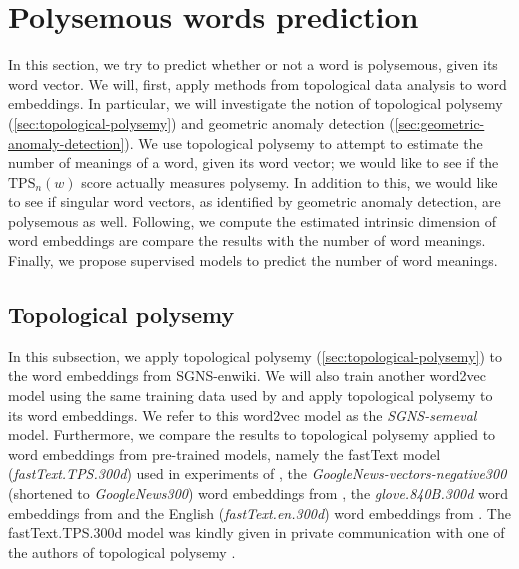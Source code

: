 \section{Polysemous words prediction}
\label{sec:analysis-of-embeddings-tda}
In this section, we try to predict whether or not a word is polysemous, given its word vector. We will, first, apply methods from topological data analysis to word embeddings. In particular, we will investigate the notion of topological polysemy (\cref{sec:topological-polysemy}) and geometric anomaly detection (\cref{sec:geometric-anomaly-detection}). We use topological polysemy to attempt to estimate the number of meanings of a word, given its word vector; we would like to see if the $\text{TPS}_n(w)$ score actually measures polysemy. In addition to this, we would like to see if singular word vectors, as identified by geometric anomaly detection, are polysemous as well. Following, we compute the estimated intrinsic dimension of word embeddings are compare the results with the number of word meanings. Finally, we propose supervised models to predict the number of word meanings.

\subsection{Topological polysemy}
\label{sec:analysis-of-embeddings-topological-polysemy}
In this subsection, we apply topological polysemy (\cref{sec:topological-polysemy}) to the word embeddings from SGNS-enwiki. We will also train another word2vec model using the same training data used by \cite{jakubowski2020topology} and apply topological polysemy to its word embeddings. We refer to this word2vec model as the \textit{SGNS-semeval} model. Furthermore, we compare the results to topological polysemy applied to word embeddings from pre-trained models, namely the fastText model (\textit{fastText.TPS.300d}) used in experiments of \cite{jakubowski2020topology}, the \textit{GoogleNews-vectors-negative300} (shortened to \textit{GoogleNews300}) word embeddings from \cite{GoogleCodeArchiveWord2vec}, the \textit{glove.840B.300d} word embeddings from \cite{GloVeProject2014} and the English (\textit{fastText.en.300d}) word embeddings from \cite{grave2018learning}. The fastText.TPS.300d model was kindly given in private communication with one of the authors of topological polysemy \cite{ZibrowiusPrivComs2021}.

